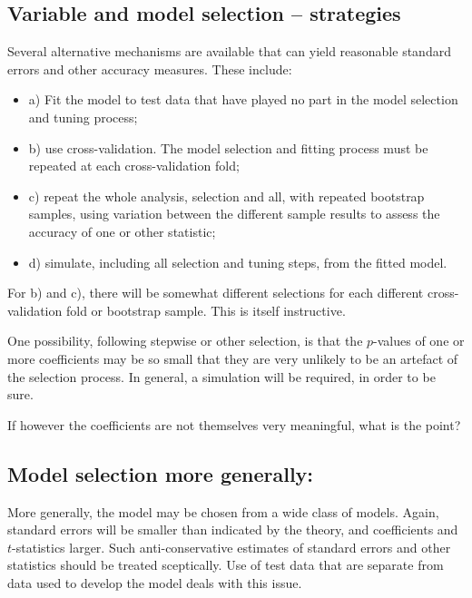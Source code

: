 \documentclass{tufte-book}\usepackage[]{graphicx}\usepackage[]{color}
\newenvironment{itemizz}%
  {\begin{itemize} %
    \setlength{\itemsep}{2pt}%
    \setlength{\parskip}{2pt}} %
  {\end{itemize}}
\begin{document}
\subsection{Variable and model selection -- strategies}

Several alternative mechanisms are available that can yield reasonable
standard errors and other accuracy measures. These include:
\begin{itemizz}
\item[a)] Fit the model to test data that have played no part in
the model selection and tuning process;
\item[b)] use cross-validation.  The model selection and fitting
process must be repeated at each cross-validation fold;
\item[c)] repeat the whole analysis, selection and all, with repeated
 bootstrap samples, using variation between the different sample
results to assess the accuracy of one or other statistic;
\item[d)] simulate, including all selection and tuning steps, from the
  fitted model.
\end{itemizz}
For b) and c), there will be somewhat different selections for each
different cross-validation fold or bootstrap sample.  This is itself
instructive.

One possibility, following stepwise or other selection, is that the
$p$-values of one or more coefficients may be so small that they are
very unlikely to be an artefact of the selection process.  In general,
a simulation will be required, in order to be sure.

If however the coefficients are not themselves very meaningful, what
is the point?

\subsection*{Model selection more generally:}


More generally, the model may be chosen from a wide class of models.
Again, standard errors will be smaller than indicated by the theory,
and coefficients and $t$-statistics larger.  Such anti-conservative
estimates of standard errors and other statistics should be treated
sceptically.  Use of test data that are separate from data used to
develop the model deals with this issue.
\end{document}
